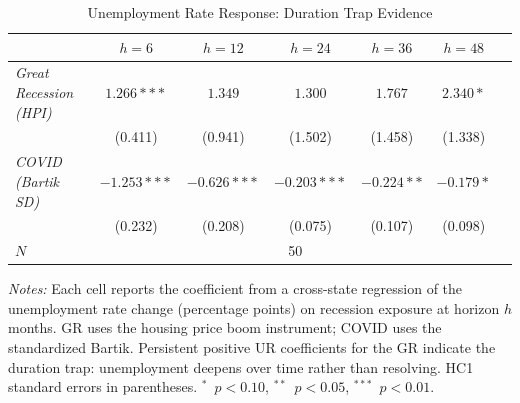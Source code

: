 \begin{table}[H]
\centering
\caption{Unemployment Rate Response: Duration Trap Evidence}
\begin{threeparttable}
\small
\begin{tabular}{lcccccc}
\toprule
& $h=6$ & $h=12$ & $h=24$ & $h=36$ & $h=48$ \\
\midrule
\textit{Great Recession (HPI)} & $1.266***$ & $1.349$ & $1.300$ & $1.767$ & $2.340*$ \\
 & (0.411) & (0.941) & (1.502) & (1.458) & (1.338) \\[6pt]
\textit{COVID (Bartik SD)} & $-1.253***$ & $-0.626***$ & $-0.203***$ & $-0.224**$ & $-0.179*$ \\
 & (0.232) & (0.208) & (0.075) & (0.107) & (0.098) \\
\midrule
$N$ & \multicolumn{5}{c}{50} \\
\bottomrule
\end{tabular}
\begin{tablenotes}[flushleft]
\small
\item \textit{Notes:} Each cell reports the coefficient from a cross-state regression of the unemployment rate change (percentage points) on recession exposure at horizon $h$ months. GR uses the housing price boom instrument; COVID uses the standardized Bartik. Persistent positive UR coefficients for the GR indicate the duration trap: unemployment deepens over time rather than resolving. HC1 standard errors in parentheses. $^{*}$~$p<0.10$, $^{**}$~$p<0.05$, $^{***}$~$p<0.01$.
\end{tablenotes}
\end{threeparttable}
\label{tab:mechanism}
\end{table}
